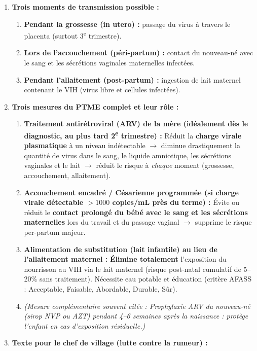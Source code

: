 \documentclass[11pt]{article}
\begin{document}
\begin{corrige}
\begin{enumerate}
\item \textbf{Trois moments de transmission possible :}
\begin{enumerate}
\item \textbf{Pendant la grossesse (in utero) :} passage du virus à travers le placenta (surtout 3\textsuperscript{e} trimestre).
\item \textbf{Lors de l'accouchement (péri-partum) :} contact du nouveau-né avec le sang et les sécrétions vaginales maternelles infectées.
\item \textbf{Pendant l'allaitement (post-partum) :} ingestion de lait maternel contenant le VIH (virus libre et cellules infectées).
\end{enumerate}
\item \textbf{Trois mesures du PTME complet et leur rôle :}
\begin{enumerate}
\item \textbf{Traitement antirétroviral (ARV) de la mère (idéalement dès le diagnostic, au plus tard 2\textsuperscript{e} trimestre) :} Réduit la \textbf{charge virale plasmatique} à un niveau indétectable $\rightarrow$ diminue drastiquement la quantité de virus dans le sang, le liquide amniotique, les sécrétions vaginales et le lait $\rightarrow$ réduit le risque à \emph{chaque} moment (grossesse, accouchement, allaitement).
\item \textbf{Accouchement encadré / Césarienne programmée (si charge virale détectable $> 1000$ copies/mL près du terme) :} Évite ou réduit le \textbf{contact prolongé du bébé avec le sang et les sécrétions maternelles} lors du travail et du passage vaginal $\rightarrow$ supprime le risque per-partum majeur.
\item \textbf{Alimentation de substitution (lait infantile) au lieu de l'allaitement maternel :} \textbf{Élimine totalement} l'exposition du nourrisson au VIH via le lait maternel (risque post-natal cumulatif de 5--20\% sans traitement). Nécessite eau potable et éducation (critère AFASS : Acceptable, Faisable, Abordable, Durable, Sûr).
\item \textit{(Mesure complémentaire souvent citée : Prophylaxie ARV du nouveau-né (sirop NVP ou AZT) pendant 4--6 semaines après la naissance : protège l'enfant en cas d'exposition résiduelle.)}
\end{enumerate}
\item \textbf{Texte pour le chef de village (lutte contre la rumeur) :}
\begin{exemplebox}

\end{exemplebox}
\end{enumerate}
\end{corrige}
\end{document}
